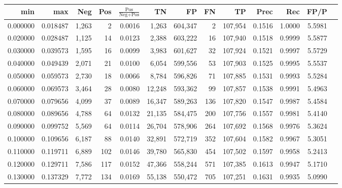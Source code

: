\begin{tabular}{rrrrrrrrrrrrr}
\toprule
     min &      max &    Neg &   Pos & $\frac{\text{Pos}}{\text{Neg}+\text{Pos}}$ &      TN &      FP &      FN &      TP &   Prec &    Rec &   FP/P \\
\midrule
0.000000 & 0.018487 &  1,263 &     2 &                                     0.0016 &   1,263 & 604,347 &       2 & 107,954 & 0.1516 & 1.0000 & 5.5981 \\
0.020000 & 0.028487 &  1,125 &    14 &                                     0.0123 &   2,388 & 603,222 &      16 & 107,940 & 0.1518 & 0.9999 & 5.5877 \\
0.030000 & 0.039573 &  1,595 &    16 &                                     0.0099 &   3,983 & 601,627 &      32 & 107,924 & 0.1521 & 0.9997 & 5.5729 \\
0.040000 & 0.049439 &  2,071 &    21 &                                     0.0100 &   6,054 & 599,556 &      53 & 107,903 & 0.1525 & 0.9995 & 5.5537 \\
0.050000 & 0.059573 &  2,730 &    18 &                                     0.0066 &   8,784 & 596,826 &      71 & 107,885 & 0.1531 & 0.9993 & 5.5284 \\
0.060000 & 0.069573 &  3,464 &    28 &                                     0.0080 &  12,248 & 593,362 &      99 & 107,857 & 0.1538 & 0.9991 & 5.4963 \\
0.070000 & 0.079656 &  4,099 &    37 &                                     0.0089 &  16,347 & 589,263 &     136 & 107,820 & 0.1547 & 0.9987 & 5.4584 \\
0.080000 & 0.089656 &  4,788 &    64 &                                     0.0132 &  21,135 & 584,475 &     200 & 107,756 & 0.1557 & 0.9981 & 5.4140 \\
0.090000 & 0.099752 &  5,569 &    64 &                                     0.0114 &  26,704 & 578,906 &     264 & 107,692 & 0.1568 & 0.9976 & 5.3624 \\
0.100000 & 0.109656 &  6,187 &    88 &                                     0.0140 &  32,891 & 572,719 &     352 & 107,604 & 0.1582 & 0.9967 & 5.3051 \\
0.110000 & 0.119711 &  6,889 &   102 &                                     0.0146 &  39,780 & 565,830 &     454 & 107,502 & 0.1597 & 0.9958 & 5.2413 \\
0.120000 & 0.129711 &  7,586 &   117 &                                     0.0152 &  47,366 & 558,244 &     571 & 107,385 & 0.1613 & 0.9947 & 5.1710 \\
0.130000 & 0.137329 &  7,772 &   134 &                                     0.0169 &  55,138 & 550,472 &     705 & 107,251 & 0.1631 & 0.9935 & 5.0990 \\

\end{tabular}
